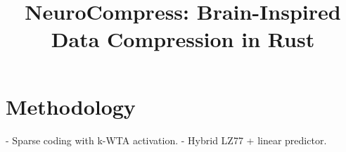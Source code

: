 \title{NeuroCompress: Brain-Inspired Data Compression in Rust}
\section{Methodology}
- Sparse coding with k-WTA activation.  
- Hybrid LZ77 + linear predictor.  
